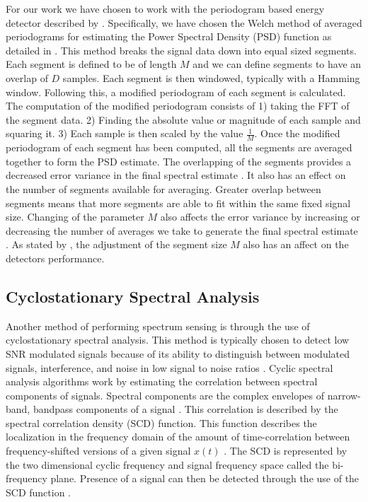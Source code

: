 For our work we have chosen to work with the periodogram based energy detector described by \cite{CabTkaBro06}.  Specifically, we have chosen the Welch method of averaged periodograms for estimating the Power Spectral Density (PSD) function as detailed in \cite{Welch67}.  This method breaks the signal data down into equal sized segments.  Each segment is defined to be of length $M$ and we can define segments to have an overlap of $D$ samples.  Each segment is then windowed, typically with a Hamming window.  Following this, a modified periodogram of each segment is calculated.  The computation of the modified periodogram consists of 1) taking the FFT of the segment data.  2) Finding the absolute value or magnitude of each sample and squaring it.  3) Each sample is then scaled by the value $\frac{1}{M}$.  Once the modified periodogram of each segment has been computed, all the segments are averaged together to form the PSD estimate.
The overlapping of the segments provides a decreased error variance in the final spectral estimate \cite{Welch67}.  It also has an effect on the number of segments available for averaging.  Greater overlap between segments means that more segments are able to fit within the same fixed signal size.  Changing of the parameter $M$ also affects the error variance by increasing or decreasing the number of averages we take to generate the final spectral estimate \cite{Welch67}.  As stated by \cite{CabTkaBro06}, the adjustment of the segment size $M$ also has an affect on the detectors performance.

\subsection{Cyclostationary Spectral Analysis}
\label{sect:cyclo}
Another method of performing spectrum sensing is through the use of cyclostationary spectral analysis.  This method is typically chosen to detect low SNR modulated signals because of its ability to distinguish between modulated signals, interference, and noise in low signal to noise ratios \cite{FenChenWan08}.  Cyclic spectral analysis algorithms work by estimating the correlation between spectral components of signals.  Spectral components are the complex envelopes of narrow-band, bandpass components of a signal \cite{RobBroLoo91}.  This correlation is described by the spectral correlation density (SCD) function.  This function describes the localization in the frequency domain of the amount of time-correlation between frequency-shifted versions of a given signal $x(t)$ \cite{Costa96}.  The SCD is represented by the two dimensional cyclic frequency and signal frequency space \cite{FenChenWan08} called the bi-frequency plane.  Presence of a signal can then be detected through the use of the SCD function \cite{Costa96}.

